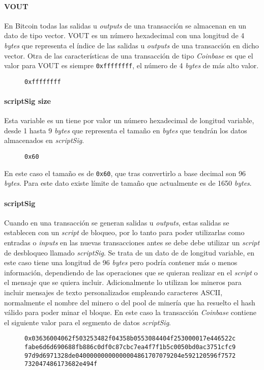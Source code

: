 \documentclass{article}
\begin{document}
    \paragraph{VOUT}
    En Bitcoin todas las salidas u \textit{outputs} de una transacción se almacenan en un dato de tipo vector. VOUT es un número hexadecimal con una longitud de 4 \textit{bytes} que representa el índice de las salidas u \textit{outputs} de una transacción en dicho vector. Otra de las características de una transacción de tipo \textit{Coinbase} es que el valor para VOUT es siempre \texttt{0xffffffff}, el número de 4 \textit{bytes} de más alto valor.
    \begin{figure}[H]
        \texttt{0xffffffff}
    \end{figure}
    
    \paragraph{scriptSig size}
    Esta variable es un tiene por valor un número hexadecimal de longitud variable, desde 1 hasta 9 \textit{bytes} que representa el tamaño en \textit{bytes} que tendrán los datos almacenados en \textit{scriptSig}.
    \begin{figure}[H]
        \texttt{0x60}
    \end{figure}
    En este caso el tamaño es de \texttt{0x60}, que tras convertirlo a base decimal son 96 \textit{bytes}. Para este dato existe límite de tamaño que actualmente es de 1650 \textit{bytes}.
    
    \paragraph{scriptSig}
    Cuando en una transacción se generan salidas u \textit{outputs}, estas salidas se establecen con un \textit{script} de bloqueo, por lo tanto para poder utilizarlas como entradas o \textit{inputs} en las nuevas transacciones antes se debe debe utilizar un \textit{script} de desbloqueo llamado \textit{scriptSig}. Se trata de un dato de de longitud variable, en este caso tiene una longitud de 96 \textit{bytes} pero podría contener más o menos información, dependiendo de las operaciones que se quieran realizar en el \textit{script} o el mensaje que se quiera incluir. Adicionalmente lo utilizan los mineros para incluir mensajes de texto personalizados empleando caracteres ASCII, normalmente el nombre del minero o del pool de minería que ha resuelto el hash válido para poder minar el bloque. En este caso la transacción \textit{Coinbase} contiene el siguiente valor para el segmento de datos \textit{scriptSig}.
    \begin{figure}[H]
        \texttt{0x03636004062f503253482f04358b0553084404f253000017e446522c} \\
        \texttt{fabe6d6d690688fb886c0df0c87cbc7ea4f7f1b5c0050bd0ac3751cfc9}
        \texttt{97d9d6971328de04000000000000004861707079204e592120596f7572}
        \texttt{732047486173682e494f}
    \end{figure}
    
\end{document}
